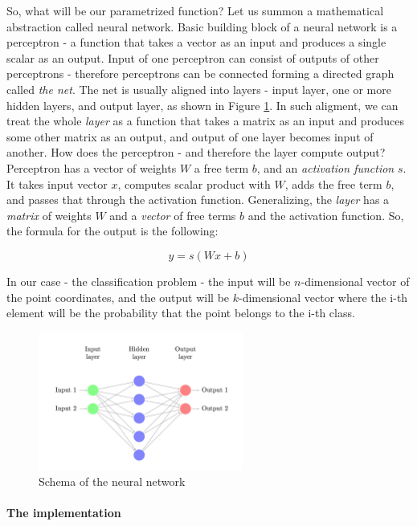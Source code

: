 \documentclass[3p,twocolumn]{elsarticle}
\begin{document}
So, what will be our parametrized function? Let us summon a mathematical abstraction called neural network. Basic building block of a neural network is a perceptron - a function that takes a vector as an input and produces a single scalar as an output. Input of one perceptron can consist of outputs of other perceptrons - therefore perceptrons can be connected forming a directed graph called \emph{the net}. The net is usually aligned into layers - input layer, one or more hidden layers, and output layer, as shown in Figure \ref{fig2}. In such aligment, we can treat the whole \emph{layer} as a function that takes a matrix as an input and produces some other matrix as an output, and output of one layer becomes input of another. How does the perceptron - and therefore the layer compute output? Perceptron has a vector of weights $W$ a free term $b$, and an \emph{activation function} $s$. It takes input vector $x$, computes scalar product with $W$, adds the free term $b$, and passes that through the activation function. Generalizing, the \emph{layer} has a \emph{matrix} of weights $W$ and a \emph{vector} of free terms $b$ and the activation function. So, the formula for the output is the following:

\[ y = s(Wx + b) \]

In our case - the classification problem - the input will be $n$-dimensional vector of the point coordinates, and the output will be $k$-dimensional vector where the i-th element will be the probability that the point belongs to the i-th class.

\begin{figure}[fig2]
	
\label{fig:fig2}
  \includegraphics[width=0.60\textwidth]{network-schema.png}
	\caption{Schema of the neural network}
	\label{fig2}
\end{figure}

\paragraph{The implementation}
\end{document}
